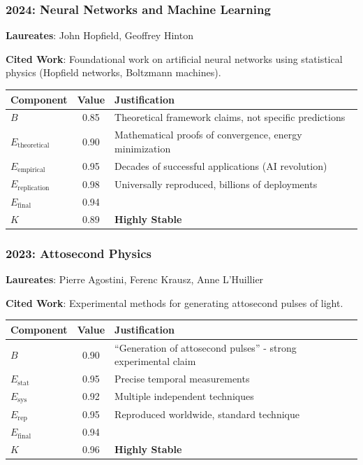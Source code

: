 \documentclass[11pt,a4paper]{article}
\begin{document}
\subsubsection{2024: Neural Networks and Machine Learning}
\textbf{Laureates}: John Hopfield, Geoffrey Hinton

\textbf{Cited Work}: Foundational work on artificial neural networks using statistical physics (Hopfield networks, Boltzmann machines).

\begin{center}
\begin{tabular}{lcl}
\toprule
\textbf{Component} & \textbf{Value} & \textbf{Justification} \\
\midrule
$B$ & 0.85 & Theoretical framework claims, not specific predictions \\
$E_{\text{theoretical}}$ & 0.90 & Mathematical proofs of convergence, energy minimization \\
$E_{\text{empirical}}$ & 0.95 & Decades of successful applications (AI revolution) \\
$E_{\text{replication}}$ & 0.98 & Universally reproduced, billions of deployments \\
\midrule
$E_{\text{final}}$ & 0.94 & \\
$K$ & 0.89 & \textbf{Highly Stable} \\
\bottomrule
\end{tabular}
\end{center}

\subsubsection{2023: Attosecond Physics}
\textbf{Laureates}: Pierre Agostini, Ferenc Krausz, Anne L'Huillier

\textbf{Cited Work}: Experimental methods for generating attosecond pulses of light.

\begin{center}
\begin{tabular}{lcl}
\toprule
\textbf{Component} & \textbf{Value} & \textbf{Justification} \\
\midrule
$B$ & 0.90 & ``Generation of attosecond pulses'' - strong experimental claim \\
$E_{\text{stat}}$ & 0.95 & Precise temporal measurements \\
$E_{\text{sys}}$ & 0.92 & Multiple independent techniques \\
$E_{\text{rep}}$ & 0.95 & Reproduced worldwide, standard technique \\
\midrule
$E_{\text{final}}$ & 0.94 & \\
$K$ & 0.96 & \textbf{Highly Stable} \\
\bottomrule
\end{tabular}
\end{center}
\end{document}
